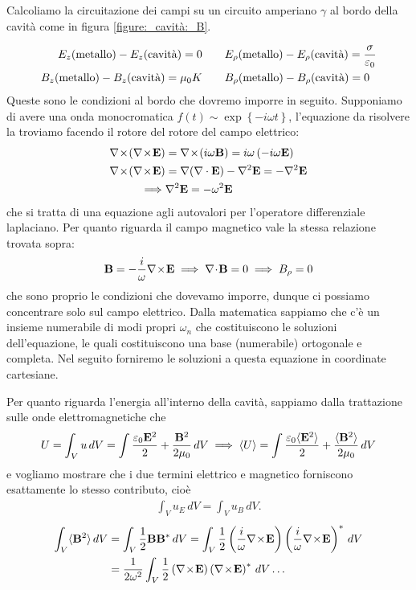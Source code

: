 Calcoliamo la circuitazione dei campi su un circuito amperiano $ \gamma $ al bordo della cavità come in figura \ref{figure:_cavità:_B}.

\begin{align}
  E_z(\text{metallo}) - E_z(\text{cavità}) = 0 &\qquad E_\rho(\text{metallo}) - E_\rho(\text{cavità}) = \frac{\sigma}{\varepsilon_0}
  \\
  B_z(\text{metallo}) - B_z(\text{cavità}) = \mu_0 K &\qquad B_\rho(\text{metallo}) - B_\rho(\text{cavità}) = 0
\end{align}
Queste sono le condizioni al bordo che dovremo imporre in seguito. Supponiamo di avere una onda monocromatica 
$ f(t) \sim \exp \left\{ -i \omega t \right\} $, l'equazione da risolvere la troviamo facendo il rotore del rotore del campo elettrico:
\begin{align}
  \nabla\!\times\!\v{ (\nabla\!\times\!\v{ E }) } &= \nabla \! \times \! \left( i \omega \v{ B } \right) 
  = i \omega \left( -i \omega \v{ E } \right)
  \\
  \nabla\!\times\!\v{ (\nabla\!\times\!\v{ E }) } &= \nabla (\nabla \cdot \v{ E }) - \nabla ^2 \v{ E } = - \nabla ^2 \v{ E }
  \\
  \implies &\nabla^2 \v{ E } = - \omega^2 \v{ E }
\end{align}
che si tratta di una equazione agli autovalori per l'operatore differenziale laplaciano. Per quanto riguarda il campo magnetico vale la stessa relazione 
trovata sopra: 
\begin{align}
  \mathbf{ B } = - \frac{i}{\omega} \nabla\!\times\!\mathbf{ E } \implies \nabla\!\cdot\!\mathbf{ B } = 0 \implies B_\rho = 0
\end{align}
che sono proprio le condizioni che dovevamo imporre, dunque ci possiamo concentrare solo sul campo elettrico. Dalla matematica sappiamo che c'è un 
insieme numerabile di modi propri $ \omega_n $ che costituiscono le soluzioni dell'equazione, le quali costituiscono una base (numerabile) ortogonale e 
completa. Nel seguito forniremo le soluzioni a questa equazione in coordinate cartesiane.

Per quanto riguarda l'energia all'interno della cavità, sappiamo dalla trattazione sulle onde elettromagnetiche che
\begin{align}
  U = \int_V u \,dV = \int \frac{\varepsilon_0 \mathbf{ E }^2}{2} + \frac{\mathbf{ B }^2}{2\mu_0} \,dV \implies \langle U \rangle 
  = \int \frac{\varepsilon_0 \langle \mathbf{ E }^2 \rangle}{2} + \frac{\langle \mathbf{ B }^2 \rangle}{2\mu_0} \,dV
\end{align}
e vogliamo mostrare che i due termini elettrico e magnetico forniscono esattamente lo stesso contributo, cioè
\begin{align}
  \int_V u_E \,dV = \int_V u_B \,dV.
\end{align}
\begin{align}
  \int_V \langle \v{ B }^2 \rangle \,dV &= \int_V \frac{1}{2} \v{ B } \v{ B }^* \,dV 
  = \int_V \frac{1}{2} \left( \frac{i}{\omega} \nabla\!\times\!\v{ E } \right) \left( \frac{i}{\omega} \nabla\!\times\!\v{ E } \right)^* \,dV 
  \\
  &= \frac{1}{2 \omega^2} \int_V \frac{1}{2} \left(  \nabla\!\times\!\v{ E } \right) \left( \nabla\!\times\!\v{ E } \right)^* \,dV \dots
\end{align}

